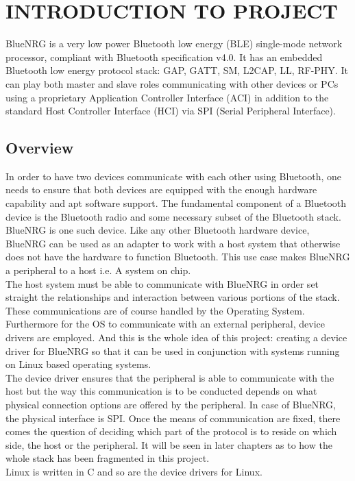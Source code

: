 \chapter{INTRODUCTION TO PROJECT}
\noindent BlueNRG is a very low power Bluetooth low energy (BLE) single-mode network processor, compliant with Bluetooth specification v4.0. It has an embedded Bluetooth low energy protocol stack: GAP, GATT, SM, L2CAP, LL, RF-PHY. It can play both master and slave roles communicating with other devices or PCs using a proprietary Application Controller Interface (ACI) in addition to the standard Host Controller Interface (HCI) via SPI (Serial Peripheral Interface). 
\section{Overview}
\noindent In order to have two devices communicate with each other using Bluetooth, one needs to ensure that both devices are equipped with the enough hardware capability and apt software support. The fundamental component of a Bluetooth device is the Bluetooth radio and some necessary subset of the Bluetooth stack. BlueNRG is one such device. Like any other Bluetooth hardware device, BlueNRG can be used as an adapter to work with a host system that otherwise does not have the hardware to function Bluetooth. This use case makes BlueNRG a peripheral to a host i.e. A system on chip. \\
\noindent The host system must be able to communicate with BlueNRG in order set straight the relationships and interaction between various portions of the stack. These communications are of course handled by the Operating System. Furthermore for the OS to communicate with an external peripheral, device drivers are employed. And this is the whole idea of this project: creating a device driver for BlueNRG so that it can be used in conjunction with systems running on Linux based operating systems.\\
\noindent The device driver ensures that the peripheral is able to communicate with the host but the way this communication is to be conducted depends on what physical connection options are offered by the peripheral. In case of BlueNRG, the physical interface is SPI. Once the means of communication are fixed, there comes the question of deciding which part of the protocol is to reside on which side, the host or the peripheral. It will be seen in later chapters as to how the whole stack has been fragmented in this project.\\
\noindent Linux is written in C and so are the device drivers for Linux.
